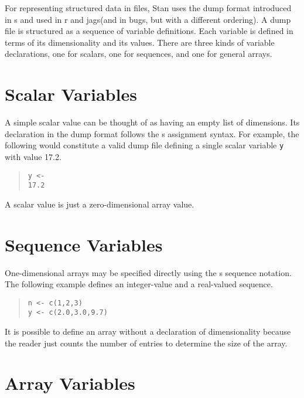 \documentclass[10pt]{report}
\newcommand{\Stan}{Stan\xspace}
\newcommand{\acronym}[1]{{\sc #1}\xspace}
\newcommand{\R}{\acronym{r}}
\newcommand{\SPLUS}{\acronym{s}}
\newcommand{\BUGS}{\acronym{bugs}}
\newcommand{\JAGS}{\acronym{jags}}
\newcommand{\code}[1]{{\tt #1}}
\begin{document}
For representing structured data in files, \Stan uses the dump format
introduced in \SPLUS and used in \R and \JAGS (and in \BUGS, but with
a different ordering).   A dump file is structured as a sequence of
variable definitions.  Each variable is defined in terms of its
dimensionality and its values.   There are three kinds of variable
declarations, one for scalars, one for sequences, and one for general
arrays.

\section{Scalar Variables}

A simple scalar value can be thought of as having an empty list of
dimensions.  Its declaration in the dump format follows the \SPLUS
assignment syntax.  For example, the following would constitute a
valid dump file defining a single scalar variable \code{y} with value
17.2.
%
\begin{quote}
\begin{Verbatim}
y <- 
17.2
\end{Verbatim}
\end{quote}
%
A scalar value is just a zero-dimensional array value.

\section{Sequence Variables}

One-dimensional arrays may be specified directly using the \SPLUS
sequence notation.  The following example defines an integer-value and
a real-valued sequence.
%
\begin{quote}
\begin{Verbatim}
n <- c(1,2,3)
y <- c(2.0,3.0,9.7)
\end{Verbatim}
\end{quote}
%
It is possible to define an array without a declaration of
dimensionality because the reader just counts the number of entries to
determine the size of the array.

\section{Array Variables}
\end{document}
